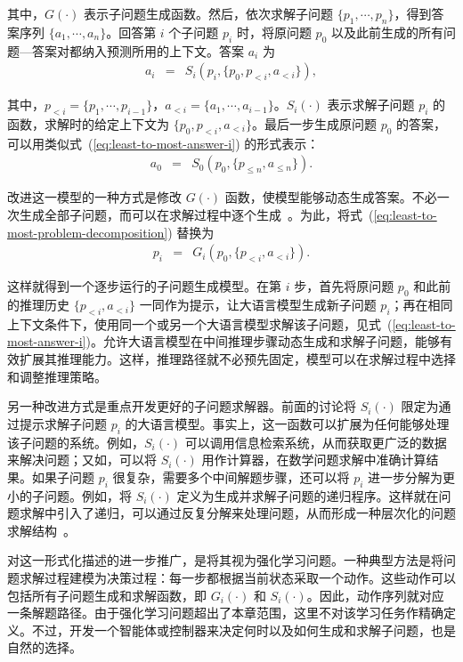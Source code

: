 \noindent 其中，$G(\cdot)$ 表示子问题生成函数。然后，依次求解子问题 $\{p_1,\cdots,p_n\}$，得到答案序列 $\{a_1,\cdots,a_n\}$。回答第 $i$ 个子问题 $p_i$ 时，将原问题 $p_0$ 以及此前生成的所有问题—答案对都纳入预测所用的上下文。答案 $a_i$ 为
\begin{eqnarray}
a_i & = & S_i(p_i,\{p_0,p_{<i},a_{<i}\}), \label{eq:least-to-most-answer-i}
\end{eqnarray}

\noindent 其中，$p_{<i}=\{p_1,\cdots,p_{i-1}\}$，$a_{<i}=\{a_1,\cdots,a_{i-1}\}$。$S_i(\cdot)$ 表示求解子问题 $p_i$ 的函数，求解时的给定上下文为 $\{p_0,p_{<i},a_{<i}\}$。最后一步生成原问题 $p_0$ 的答案，可以用类似式~(\ref{eq:least-to-most-answer-i}) 的形式表示：
\begin{eqnarray}
a_0 & = & S_0(p_0,\{p_{\le n},a_{\le n}\}).
\end{eqnarray}

改进这一模型的一种方式是修改 $G(\cdot)$ 函数，使模型能够动态生成答案。不必一次生成全部子问题，而可以在求解过程中逐个生成~\cite{dua-etal:2022successive}。为此，将式~(\ref{eq:least-to-most-problem-decomposition}) 替换为
\begin{eqnarray}
p_i & = & G_i(p_0,\{p_{<i},a_{<i}\}).
\end{eqnarray}

\noindent 这样就得到一个逐步运行的子问题生成模型。在第 $i$ 步，首先将原问题 $p_0$ 和此前的推理历史 $\{p_{<i},a_{<i}\}$ 一同作为提示，让大语言模型生成新子问题 $p_i$；再在相同上下文条件下，使用同一个或另一个大语言模型求解该子问题，见式~(\ref{eq:least-to-most-answer-i})。允许大语言模型在中间推理步骤动态生成和求解子问题，能够有效扩展其推理能力。这样，推理路径就不必预先固定，模型可以在求解过程中选择和调整推理策略。

另一种改进方式是重点开发更好的子问题求解器。前面的讨论将 $S_i(\cdot)$ 限定为通过提示求解子问题 $p_i$ 的大语言模型。事实上，这一函数可以扩展为任何能够处理该子问题的系统。例如，$S_i(\cdot)$ 可以调用信息检索系统，从而获取更广泛的数据来解决问题；又如，可以将 $S_i(\cdot)$ 用作计算器，在数学问题求解中准确计算结果。如果子问题 $p_i$ 很复杂，需要多个中间解题步骤，还可以将 $p_i$ 进一步分解为更小的子问题。例如，将 $S_i(\cdot)$ 定义为生成并求解子问题的递归程序。这样就在问题求解中引入了递归，可以通过反复分解来处理问题，从而形成一种层次化的问题求解结构~\cite{khot2023:decomposed}。

对这一形式化描述的进一步推广，是将其视为强化学习问题。一种典型方法是将问题求解过程建模为决策过程：每一步都根据当前状态采取一个动作。这些动作可以包括所有子问题生成和求解函数，即 $G_i(\cdot)$ 和 $S_i(\cdot)$。因此，动作序列就对应一条解题路径。由于强化学习问题超出了本章范围，这里不对该学习任务作精确定义。不过，开发一个智能体或控制器来决定何时以及如何生成和求解子问题，也是自然的选择。

